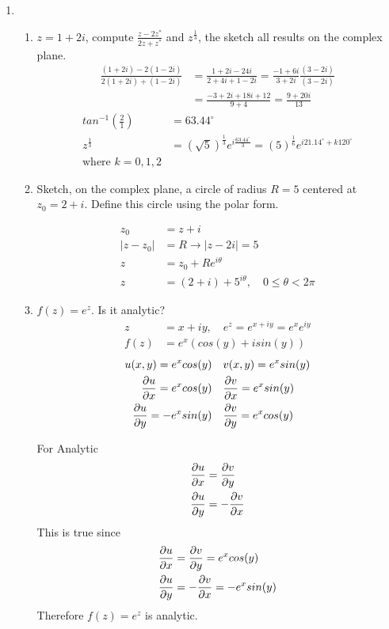 \documentclass[12pt]{article}
\begin{document}
\begin{enumerate}
	\item 
		\begin{enumerate}
		    \item $z=1+2i$, compute $\frac{z-2z^{*}}{2z+z^{*}}$ and $z^{\frac{1}{3}}$, the sketch all results on the complex plane.
			    \begin{align*}
				    \frac{(1+2i)-2(1-2i)}{2(1+2i)+(1-2i)} &= \frac{1+2i-24i}{2+4i+1-2i}=\frac{-1+6i}{3+2i}\frac{(3-2i)}{(3-2i)}\\
									  &= \frac{-3+2i+18i+12}{9+4} = \frac{9+20i}{13}
			    \end{align*}
			    \begin{align*}
				    tan^{-1}(\frac{2}{1})&=63.44^{\circ}\\
				    z^{\frac{1}{3}}&=(\sqrt{5})^{\frac{1}{3}}e^{i \frac{63.44^{\circ}}{3}}=(5)^{\frac{1}{6}}e^{i21.14^{\circ}+k120^{\circ}}\\
				    \text{where $k =0,1,2$}
			    \end{align*}
		\item Sketch, on the complex plane, a circle of radius $R=5$ centered at $z_{0} = 2 +i$. Define this circle using the polar form.
			
		\begin{align*}
			z_{0}&=z+i\\
			|z-z_{0}|&=R\rightarrow |z-2i|=5\\
			z&=z_{0}+Re^{i \theta}\\
			z&=(2+i)+5^{i \theta}, \quad 0 \leq \theta < 2\pi
		\end{align*}


		\item $f(z) = e^{z}$. Is it analytic?
			\begin{align*}
				z&=x+iy, \quad e^{z}=e^{x+iy}=e^{x}e^{iy}\\
				f(z)&=e^{x}(cos(y)+isin(y))
			\end{align*}
			\begin{align*}
				u(x,y) = e^{x}cos(y) & \quad v(x,y)=e^{x}sin(y)\\
				\pdv{u}{x}=e^{x}cos(y) &\quad \pdv{v}{x}=e^{x}sin(y)\\
				\pdv{u}{y}=-e^{x}sin(y) &\quad \pdv{v}{y}=e^{x}cos(y)
			\end{align*}

			For Analytic
			\begin{align*}
				\pdv{u}{x}&=\pdv{v}{y}\\
				\pdv{u}{y}&=-\pdv{v}{x}
			\end{align*}
			This is true since
			\begin{align*}
				\pdv{u}{x}&=\pdv{v}{y}=e^{x}cos(y)\\
				\pdv{u}{y}&=-\pdv{v}{x}=-e^{x}sin(y)
			\end{align*}
			Therefore $f(z)=e^{z}$ is analytic.
		\end{enumerate}




\end{enumerate}
\end{document}
